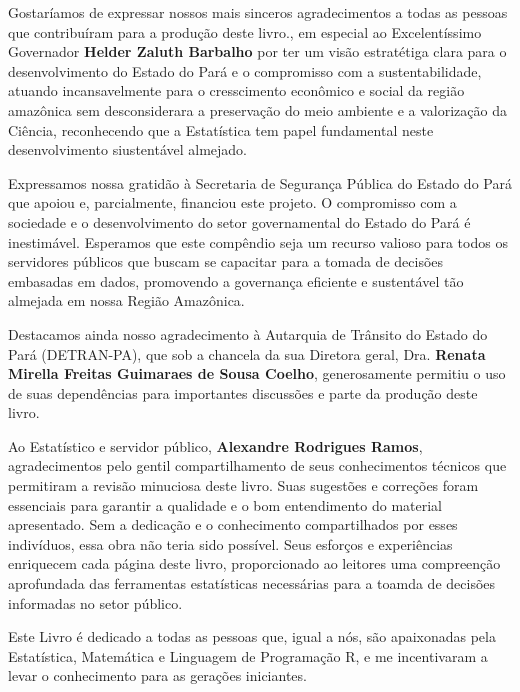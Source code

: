 \begin{refsection}


Gostaríamos de expressar nossos mais sinceros agradecimentos a todas as pessoas que contribuíram para a produção deste livro., em especial ao Excelentíssimo Governador \textbf{Helder Zaluth Barbalho} por ter um visão estratétiga clara para o desenvolvimento do Estado do Pará e o compromisso com a sustentabilidade, atuando incansavelmente para o cresscimento econômico e social da região amazônica sem desconsiderara a preservação do meio ambiente e a valorização da Ciência, reconhecendo que a Estatística tem papel fundamental neste desenvolvimento siustentável almejado.\vst

Expressamos nossa gratidão à Secretaria de Segurança Pública do Estado do Pará que apoiou e, parcialmente, financiou este projeto. O compromisso com a sociedade e o desenvolvimento do setor governamental do Estado do Pará é inestimável. Esperamos que este compêndio seja um recurso valioso para todos os servidores públicos que buscam se capacitar para a tomada de decisões embasadas em dados, promovendo a governança eficiente e sustentável tão almejada em nossa Região Amazônica.\vst

Destacamos ainda nosso agradecimento à Autarquia de Trânsito do Estado do Pará (DETRAN-PA), que sob a chancela da sua Diretora geral, Dra. \textbf{Renata Mirella Freitas Guimaraes de Sousa Coelho}, generosamente permitiu o uso de suas dependências para importantes discussões e parte da produção deste livro.
\vst

Ao Estatístico e servidor público, \textbf{Alexandre Rodrigues Ramos}, agradecimentos pelo gentil compartilhamento de seus conhecimentos técnicos que permitiram a revisão minuciosa deste livro. Suas sugestões e correções foram essenciais para garantir a qualidade e o bom entendimento do material apresentado. Sem a dedicação e o conhecimento compartilhados por esses indivíduos, essa obra não teria sido possível. Seus esforços e experiências enriquecem cada página deste livro, proporcionado ao leitores uma compreenção aprofundada das ferramentas estatísticas necessárias para a toamda de decisões informadas no setor público.

\newpage

Este Livro é dedicado a todas as pessoas que, igual a nós, são apaixonadas pela Estatística, Matemática e Linguagem de Programação R, e me incentivaram a levar o conhecimento para as gerações iniciantes.
\vst







\printbibliography[heading=subbibliography]
\end{refsection}






